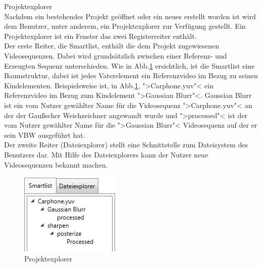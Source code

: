  Projektexplorer \\
Nachdem ein bestehendes Projekt geöffnet oder ein neues erstellt worden ist wird dem
Benutzer, unter anderem, ein Projektexplorer zur Verfügung gestellt. Ein Projektexplorer ist ein 
Fenster das zwei Registerreiter enthält. \\
Der erste Reiter, die Smartlist, enthält die dem Projekt zugewiesenen Videosequenzen. Dabei wird
grundsätzlich zwischen einer Referenz- und Erzeugten Sequenz unterschieden. Wie in Abb.\ref{pExplorer}
ersichtlich, ist die Smartlist eine Baumstruktur, dabei ist jedes Vaterelement
ein Referenzvideo im Bezug zu seinen Kindelementen. Beispielsweise ist, in Abb.\ref{pExplorer}, 
">Carphone.yuv"< ein Referenzvideo im Bezug zum Kindelement ">Gaussian Blurr"<. Gaussian Blurr ist ein
vom Nutzer gewählter Name für die Videosequenz ">Carphone.yuv"< an der der Gaußscher Weichzeichner angewandt
wurde und ">processed"< ist der vom Nutzer gewählter Name für die ">Gaussian Blurr"< Videosequenz auf
der er sein \gls{VBW} ausgeführt hat.\\
Der zweite Reiter (Dateiexplorer) stellt eine Schnittstelle zum Dateisystem des Benutzers dar. Mit Hilfe
des Dateiexplorers kann der Nutzer \projektTitel neue Videosequenzen bekannt machen.
\begin{figure}[h]
\includegraphics[scale=1]{bilder/projektexplorer.png}
\caption{Projektexplorer}
\label{pExplorer}
\end{figure}

